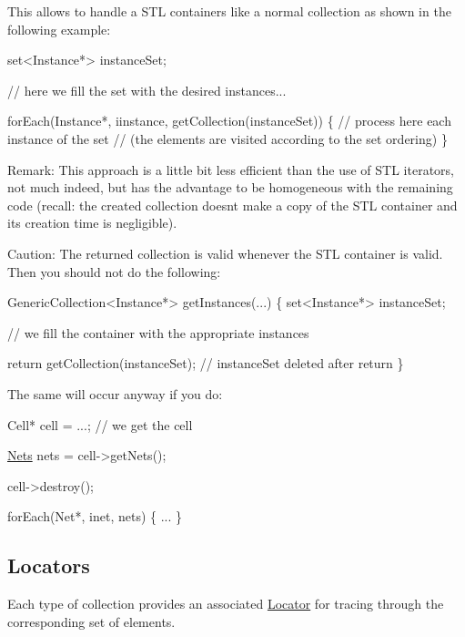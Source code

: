 This allows to handle a S\+TL containers like a normal collection as shown in the following example\+: 
\begin{DoxyCode}
set<Instance*> instanceSet;
 
\textcolor{comment}{// here we fill the set with the desired instances... }
 
forEach(Instance*, iinstance, getCollection(instanceSet)) \{
   \textcolor{comment}{// process here each instance of the set}
   \textcolor{comment}{// (the elements are visited according to the set ordering)}
\}
\end{DoxyCode}


\begin{DoxyParagraph}{Remark\+: This approach is a little bit less efficient than the use of }
S\+TL iterators, not much indeed, but has the advantage to be homogeneous with the remaining code (recall\+: the created collection doesn\textquotesingle{}t make a copy of the S\+TL container and its creation time is negligible).
\end{DoxyParagraph}
\begin{DoxyParagraph}{Caution\+: The returned collection is valid whenever the S\+TL container }
is valid. Then you should not do the following\+: 
\begin{DoxyCode}
GenericCollection<Instance*> getInstances(...)
\{
   set<Instance*> instanceSet;
 
   \textcolor{comment}{// we fill the container with the appropriate instances}
 
   \textcolor{keywordflow}{return} getCollection(instanceSet); \textcolor{comment}{// instanceSet deleted after return}
\}
\end{DoxyCode}

\end{DoxyParagraph}
The same will occur anyway if you do\+: 
\begin{DoxyCode}
Cell* cell = ...; \textcolor{comment}{// we get the cell}
 
\mbox{\hyperlink{namespaceHurricane_a3404a8b17130a1824f4a281704b04df7}{Nets}} nets = cell->getNets();
 
cell->destroy();
 
forEach(Net*, inet, nets) \{
   ...
\}
\end{DoxyCode}
\hypertarget{classHurricane_1_1Collection_secCollectionLocators}{}\subsection{Locators}\label{classHurricane_1_1Collection_secCollectionLocators}
Each type of collection provides an associated \mbox{\hyperlink{classHurricane_1_1Locator}{Locator}} for tracing through the corresponding set of elements.

